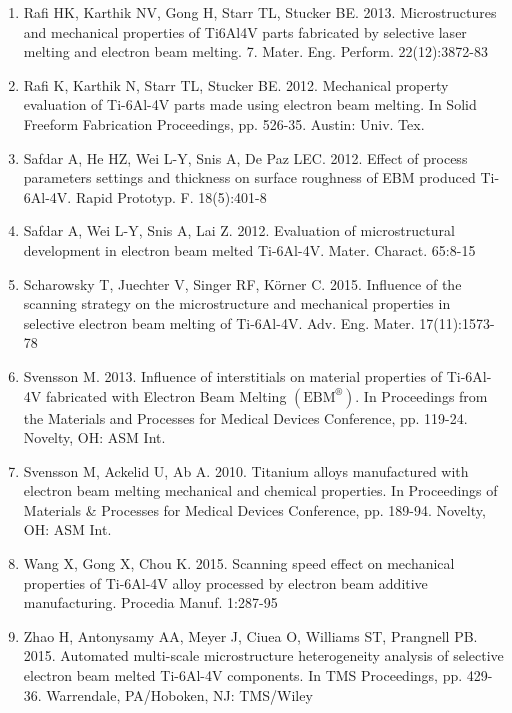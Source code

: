 \documentclass[10pt]{article}
\begin{document}
\begin{enumerate}
  \item Rafi HK, Karthik NV, Gong H, Starr TL, Stucker BE. 2013. Microstructures and mechanical properties of Ti6Al4V parts fabricated by selective laser melting and electron beam melting. 7. Mater. Eng. Perform. 22(12):3872-83

  \item Rafi K, Karthik N, Starr TL, Stucker BE. 2012. Mechanical property evaluation of Ti-6Al-4V parts made using electron beam melting. In Solid Freeform Fabrication Proceedings, pp. 526-35. Austin: Univ. Tex.

  \item Safdar A, He HZ, Wei L-Y, Snis A, De Paz LEC. 2012. Effect of process parameters settings and thickness on surface roughness of EBM produced Ti-6Al-4V. Rapid Prototyp. F. 18(5):401-8

  \item Safdar A, Wei L-Y, Snis A, Lai Z. 2012. Evaluation of microstructural development in electron beam melted Ti-6Al-4V. Mater. Charact. 65:8-15

  \item Scharowsky T, Juechter V, Singer RF, Körner C. 2015. Influence of the scanning strategy on the microstructure and mechanical properties in selective electron beam melting of Ti-6Al-4V. Adv. Eng. Mater. 17(11):1573-78

  \item Svensson M. 2013. Influence of interstitials on material properties of Ti-6Al-4V fabricated with Electron Beam Melting $\left(\mathrm{EBM}^{\circledR}\right)$. In Proceedings from the Materials and Processes for Medical Devices Conference, pp. 119-24. Novelty, OH: ASM Int.

  \item Svensson M, Ackelid U, Ab A. 2010. Titanium alloys manufactured with electron beam melting mechanical and chemical properties. In Proceedings of Materials \& Processes for Medical Devices Conference, pp. 189-94. Novelty, OH: ASM Int.

  \item Wang X, Gong X, Chou K. 2015. Scanning speed effect on mechanical properties of Ti-6Al-4V alloy processed by electron beam additive manufacturing. Procedia Manuf. 1:287-95

  \item Zhao H, Antonysamy AA, Meyer J, Ciuea O, Williams ST, Prangnell PB. 2015. Automated multi-scale microstructure heterogeneity analysis of selective electron beam melted Ti-6Al-4V components. In TMS Proceedings, pp. 429-36. Warrendale, PA/Hoboken, NJ: TMS/Wiley


\end{enumerate}
\end{document}
